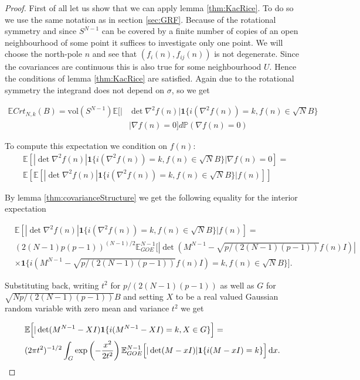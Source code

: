 \begin{proof}
First of all let us show that we can apply lemma \ref{thm:KacRice}. To do so we use the same notation as in section \ref{sec:GRF}. Because of the rotational symmetry and since $S^{N-1}$ can be covered by a finite number of copies of an open neighbourhood of some point it suffices to investigate only one point. We will choose the north-pole $n$ and see that $(f_i(n),f_{ij}(n))$ is not degenerate. Since the covariances are continuous this is also true for some neighbourhood $U$. Hence the conditions of lemma \ref{thm:KacRice} are satisfied. Again due to the rotational symmetry the integrand does not depend on $\sigma$, so we get

\begin{align*}
	\mathbb E Crt_{N,k}(B)=
	\text{vol}(S^{N-1})\mathbb E[|&\det\nabla^2 f(n)|\mathbf 1\{i(\nabla^2 f(n))=k, f(n)\in\sqrt NB\}\\&|\nabla f(n)=0]d\mathbb P(\nabla f(n)=0)
\end{align*}

To compute this expectation we condition on $f(n)$:
\begin{align*}
	&\mathbb E[|\det\nabla^2 f(n)|\mathbf 1\{i(\nabla^2 f(n))=k, f(n)\in\sqrt NB\}|\nabla f(n)=0]=\\
	&\mathbb E\left[\mathbb E[|\det\nabla^2 f(n)|\mathbf 1\{i(\nabla^2 f(n))=k,f(n)\in\sqrt NB\}|f(n)]\right]
\end{align*}

By lemma \ref{thm:covarianceStructure} we get the following equality for the interior expectation

\begin{align*}
	&\mathbb E[|\det\nabla^2 f(n)|\mathbf 1\{i(\nabla^2 f(n))=k,f(n)\in\sqrt NB\}|f(n)]=\\
	&(2(N-1)p(p-1))^{(N-1)/2}\mathbb E_{GOE}^{N-1}\Big[|\det(M^{N-1}-\sqrt{p/(2(N-1)(p-1))}f(n)I)|\\&\times\mathbf 1\{i(M^{N-1}-\sqrt{p/(2(N-1)(p-1))}f(n)I)=k,f(n)\in\sqrt NB\}\Big].
\end{align*}

Substituting back, writing $t^2$ for $p/(2(N-1)(p-1))$ as well as $G$ for $\sqrt{Np/(2(N-1)(p-1))}B$ and setting $X$ to be a real valued Gaussian random variable with zero mean and variance $t^2$ we get 

\begin{align}\label{eq:expressEintermsofEGOE}
	&\mathbb E\Big[|\det(M^{N-1}-XI)\mathbf 1\{i(M^{N-1}-XI)=k,X\in G\}\Big]=\nonumber\\
	&(2\pi t^2)^{-1/2}\int_G\exp\left(-\frac{x^2}{2t^2}\right)\mathbb E_{GOE}^{N-1}\Big[|\det(M-xI)|\mathbf 1\{i(M-xI)=k\}\Big]\mathop{}\!\mathrm{d} x.
\end{align}


\end{proof}
